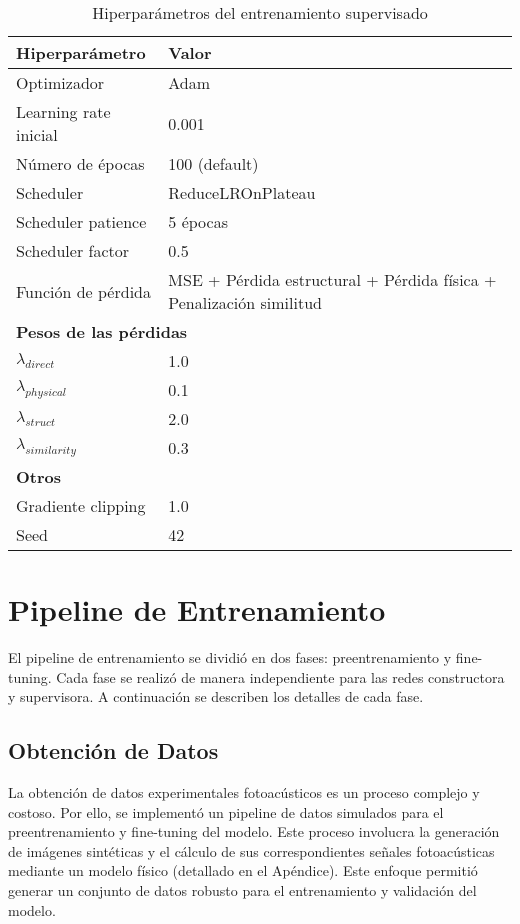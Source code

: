 \begin{table}[H]
    \centering
    \begin{tabular}{ll}
    \hline
    \textbf{Hiperparámetro} & \textbf{Valor} \\
    \hline
    Optimizador & Adam \\
    Learning rate inicial & 0.001 \\
    Número de épocas & 100 (default) \\
    Scheduler & ReduceLROnPlateau \\
    Scheduler patience & 5 épocas \\
    Scheduler factor & 0.5 \\
    Función de pérdida & MSE + Pérdida estructural + Pérdida física + Penalización similitud \\
    \hline
    \multicolumn{2}{l}{\textbf{Pesos de las pérdidas}} \\
    $\lambda_{direct}$ & 1.0 \\
    $\lambda_{physical}$ & 0.1 \\
    $\lambda_{struct}$ & 2.0 \\
    $\lambda_{similarity}$ & 0.3 \\
    \hline
    \textbf{Otros} & \\
    Gradiente clipping & 1.0 \\
    Seed & 42 \\
    \hline
    \end{tabular}
    \caption{Hiperparámetros del entrenamiento supervisado}
    \label{tab:hyperparameters_supervised}
\end{table}


\section{Pipeline de Entrenamiento}
El pipeline de entrenamiento se dividió en dos fases: preentrenamiento y fine-tuning. Cada fase se realizó de manera independiente para las redes constructora y supervisora. A continuación se describen los detalles de cada fase.
\subsection{Obtención de Datos}
La obtención de datos experimentales fotoacústicos es un proceso complejo y costoso. Por ello, se implementó un pipeline de datos simulados para el preentrenamiento y fine-tuning del modelo. Este proceso involucra la generación de imágenes sintéticas y el cálculo de sus correspondientes señales fotoacústicas mediante un modelo físico (detallado en el Apéndice). Este enfoque permitió generar un conjunto de datos robusto para el entrenamiento y validación del modelo.
